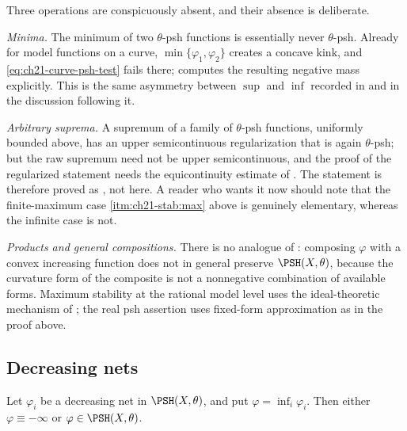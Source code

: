 \begin{remark}
\label{rem:ch21-not-stable}
Three operations are conspicuously absent, and their absence is deliberate.

\emph{Minima.}  The minimum of two \(\theta\)-psh functions is essentially
never \(\theta\)-psh.  Already for model functions on a curve,
\(\min\{\varphi_1,\varphi_2\}\) creates a concave kink, and
\eqref{eq:ch21-curve-psh-test} fails there;
 computes the resulting negative mass
explicitly.  This is the same asymmetry between \(\sup\) and \(\inf\)
recorded in  and in the discussion following it.

\emph{Arbitrary suprema.}  A supremum of a family of \(\theta\)-psh
functions, uniformly bounded above, has an upper semicontinuous
regularization that is again \(\theta\)-psh; but the raw supremum need not
be upper semicontinuous, and the proof of the regularized statement needs
the equicontinuity estimate of .  The statement
is therefore proved as , not here.  A reader
who wants it now should note that the finite-maximum case
\cref{itm:ch21-stab:max} above is genuinely elementary, whereas the infinite
case is not.

\emph{Products and general compositions.}  There is no analogue of
: composing \(\varphi\) with a convex increasing
function does not in general preserve \(\PSH(X,\theta)\), because the
curvature form of the composite is not a nonnegative combination of
available forms.  Maximum stability at the rational model level uses
the ideal-theoretic mechanism of ; the real
psh assertion uses fixed-form approximation as in the proof above.
\end{remark}

\subsection{Decreasing nets}
\label{sec:ch21-decreasing}

\begin{theorem}\label{thm:ch21-decreasing-stability}
Let \(\varphi_i\) be a decreasing net in \(\PSH(X,\theta)\), and put
\(\varphi=\inf_i\varphi_i\).  Then either
\(\varphi\equiv-\infty\) or \(\varphi\in\PSH(X,\theta)\).
\end{theorem}

